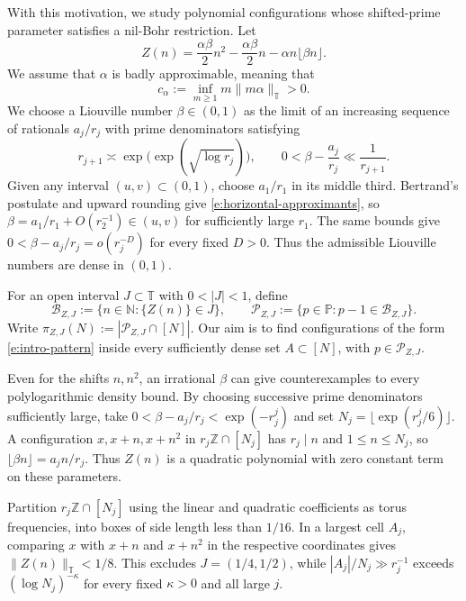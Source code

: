 \documentclass[12pt]{amsart}
\newcommand{\1}{\mathbf 1}
\theoremstyle{definition}
\begin{document}
With this motivation, we study polynomial configurations whose
shifted-prime parameter satisfies a nil-Bohr restriction. Let
\begin{equation}\label{e:heisenberg-phase}
 Z(n)=\frac{\alpha\beta}{2}n^2-\frac{\alpha\beta}{2}n
       -\alpha n\lfloor\beta n\rfloor.
\end{equation}
We assume that $\alpha$ is badly approximable, meaning that
\begin{equation}\label{e:badly-approximable}
 c_\alpha:=\inf_{m\geq1}m\|m\alpha\|_{\mathbb T}>0.
\end{equation}
We choose a Liouville number $\beta\in(0,1)$ as the limit of an increasing sequence of
rationals $a_j/r_j$ with prime denominators satisfying
\begin{equation}\label{e:horizontal-approximants}
 r_{j+1}\asymp\exp\!\bigl(\exp(\sqrt{\log r_j})\bigr),
 \qquad 0<\beta-\frac{a_j}{r_j}\ll\frac1{r_{j+1}}.
\end{equation}
Given any interval $(u,v)\subset(0,1)$, choose $a_1/r_1$ in its
middle third. Bertrand's postulate and upward rounding give
\eqref{e:horizontal-approximants}, so
$\beta=a_1/r_1+O(r_2^{-1})\in(u,v)$ for sufficiently large $r_1$.
The same bounds give $0<\beta-a_j/r_j=o(r_j^{-D})$ for every
fixed $D>0$. Thus the admissible Liouville numbers are dense
in $(0,1)$.

For an open interval $J\subset\mathbb T$ with $0<|J|<1$, define
\begin{equation}\label{e:explicit-B}
 \mathcal B_{Z,J}:=\{n\in\mathbb N:\{Z(n)\}\in J\},
 \qquad
 \mathcal P_{Z,J}:=\{p\in\mathbb P:p-1\in\mathcal B_{Z,J}\}.
\end{equation}
Write $\pi_{Z,J}(N):=|\mathcal P_{Z,J}\cap[N]|$.
Our aim is to find configurations of the form \eqref{e:intro-pattern} 
inside every sufficiently dense set $A\subset[N]$, with
$p\in\mathcal P_{Z,J}$.

\medskip

Even for the shifts $n,n^2$, an irrational $\beta$ can give
counterexamples to every polylogarithmic density bound. By choosing
successive prime denominators sufficiently large, take
$0<\beta-a_j/r_j<\exp(-r_j^j)$ and set
$N_j=\lfloor\exp(r_j^j/6)\rfloor$. A configuration
$x,x+n,x+n^2$ in $r_j\mathbb Z\cap[N_j]$ has $r_j\mid n$ and
$1\leq n\leq N_j$, so $\lfloor\beta n\rfloor=a_jn/r_j$.
Thus $Z(n)$ is a quadratic polynomial with zero constant term
on these parameters.

Partition $r_j\mathbb Z\cap[N_j]$ using the linear and quadratic
coefficients as torus frequencies, into boxes of side length less
than $1/16$. In a largest cell $A_j$, comparing $x$ with $x+n$
and $x+n^2$ in the respective coordinates gives
$\|Z(n)\|_{\mathbb T}<1/8$. This excludes $J=(1/4,1/2)$, while
$|A_j|/N_j\gg r_j^{-1}$ exceeds $(\log N_j)^{-\kappa}$ for
every fixed $\kappa>0$ and all large $j$.
\end{document}
